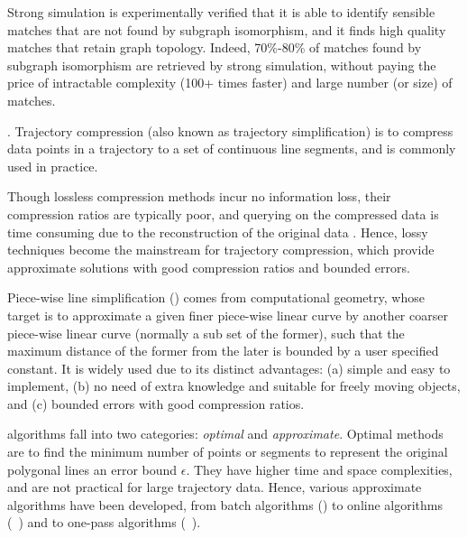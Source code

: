 Strong simulation is experimentally verified that it is able to identify sensible matches that are not found by subgraph isomorphism, and it finds high
quality matches that retain graph topology. Indeed, 70\%-80\% of matches found by subgraph
isomorphism are retrieved by strong simulation, without paying the price of intractable complexity (100+ times faster) and large number (or
size) of matches.



.  Trajectory compression (also known as trajectory simplification) is to compress data points in a trajectory to a set of continuous line segments, and is commonly used  in practice.

Though lossless compression methods incur no information loss, their compression ratios are typically poor, and querying on the compressed data is time consuming due to the reconstruction of the original data \cite{Nibali:Trajic}. Hence, lossy techniques become the mainstream for trajectory compression,
which provide approximate solutions with good compression ratios and bounded errors.


Piece-wise line simplification (\lsa) comes from computational geometry, whose target is to approximate a given finer piece-wise linear curve by another coarser piece-wise linear curve ({normally} a sub set of the former), such that the maximum distance of the former from the later is bounded by a user specified constant. It is widely used due to its distinct advantages: (a) simple and easy to implement, (b) no need of extra knowledge and suitable for freely  moving  objects, and (c) bounded errors with good compression ratios.

\lsa algorithms fall into two categories: {\em optimal} and {\em approximate}.
Optimal methods\cite{Imai:Optimal} are to find the minimum number of points or segments to represent the original polygonal lines \wrt an error bound $\epsilon$. They have higher time and space complexities, and are not practical for large trajectory data.
Hence,  various approximate \lsa algorithms have been developed, from batch algorithms (\eg \cite{Douglas:Peucker}) to online algorithms (\eg~\cite{Liu:BQS}) and to one-pass algorithms (\eg~\cite{LinMZWH17}).



